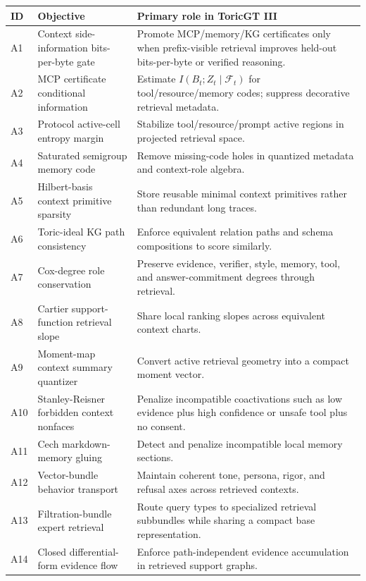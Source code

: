 \documentclass[11pt]{article}
\numberwithin{equation}{section}
\begin{document}
\small
\begin{longtable}{p{}p{}p{}}
\toprule
ID & Objective & Primary role in ToricGT III\\
\midrule
\endhead
A1 & Context side-information bits-per-byte gate & Promote MCP/memory/KG certificates only when prefix-visible retrieval improves held-out bits-per-byte or verified reasoning.\\
A2 & MCP certificate conditional information & Estimate $I(B_t;Z_t\mid\mathcal{F}_t)$ for tool/resource/memory codes; suppress decorative retrieval metadata.\\
A3 & Protocol active-cell entropy margin & Stabilize tool/resource/prompt active regions in projected retrieval space.\\
A4 & Saturated semigroup memory code & Remove missing-code holes in quantized metadata and context-role algebra.\\
A5 & Hilbert-basis context primitive sparsity & Store reusable minimal context primitives rather than redundant long traces.\\
A6 & Toric-ideal KG path consistency & Enforce equivalent relation paths and schema compositions to score similarly.\\
A7 & Cox-degree role conservation & Preserve evidence, verifier, style, memory, tool, and answer-commitment degrees through retrieval.\\
A8 & Cartier support-function retrieval slope & Share local ranking slopes across equivalent context charts.\\
A9 & Moment-map context summary quantizer & Convert active retrieval geometry into a compact moment vector.\\
A10 & Stanley-Reisner forbidden context nonfaces & Penalize incompatible coactivations such as low evidence plus high confidence or unsafe tool plus no consent.\\
A11 & Cech markdown-memory gluing & Detect and penalize incompatible local memory sections.\\
A12 & Vector-bundle behavior transport & Maintain coherent tone, persona, rigor, and refusal axes across retrieved contexts.\\
A13 & Filtration-bundle expert retrieval & Route query types to specialized retrieval subbundles while sharing a compact base representation.\\
A14 & Closed differential-form evidence flow & Enforce path-independent evidence accumulation in retrieved support graphs.\\

\end{longtable}
\end{document}
